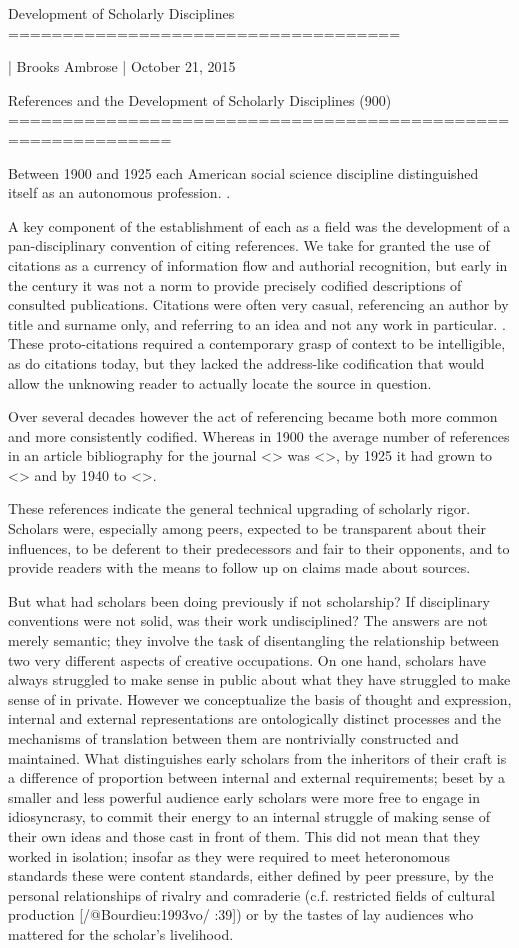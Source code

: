 Development of Scholarly Disciplines
====================================

| Brooks Ambrose
| October 21, 2015

References and the Development of Scholarly Disciplines (900)
=============================================================

Between 1900 and 1925 each American social science discipline
distinguished itself as an autonomous profession. .

A key component of the establishment of each as a field was the
development of a pan-disciplinary convention of citing references. We
take for granted the use of citations as a currency of information flow
and authorial recognition, but early in the century it was not a norm to
provide precisely codified descriptions of consulted publications.
Citations were often very casual, referencing an author by title and
surname only, and referring to an idea and not any work in particular. .
These proto-citations required a contemporary grasp of context to be
intelligible, as do citations today, but they lacked the address-like
codification that would allow the unknowing reader to actually locate
the source in question.

Over several decades however the act of referencing became both more
common and more consistently codified. Whereas in 1900 the average
number of references in an article bibliography for the journal <> was
<>, by 1925 it had grown to <> and by 1940 to <>.

These references indicate the general technical upgrading of scholarly
rigor. Scholars were, especially among peers, expected to be transparent
about their influences, to be deferent to their predecessors and fair to
their opponents, and to provide readers with the means to follow up on
claims made about sources.

But what had scholars been doing previously if not scholarship? If
disciplinary conventions were not solid, was their work undisciplined?
The answers are not merely semantic; they involve the task of
disentangling the relationship between two very different aspects of
creative occupations. On one hand, scholars have always struggled to
make sense in public about what they have struggled to make sense of in
private. However we conceptualize the basis of thought and expression,
internal and external representations are ontologically distinct
processes and the mechanisms of translation between them are
nontrivially constructed and maintained. What distinguishes early
scholars from the inheritors of their craft is a difference of
proportion between internal and external requirements; beset by a
smaller and less powerful audience early scholars were more free to
engage in idiosyncrasy, to commit their energy to an internal struggle
of making sense of their own ideas and those cast in front of them. This
did not mean that they worked in isolation; insofar as they were
required to meet heteronomous standards these were content standards,
either defined by peer pressure, by the personal relationships of
rivalry and comraderie (c.f. restricted fields of cultural production
[/@Bourdieu:1993vo/ :39]) or by the tastes of lay audiences who mattered
for the scholar's livelihood.

